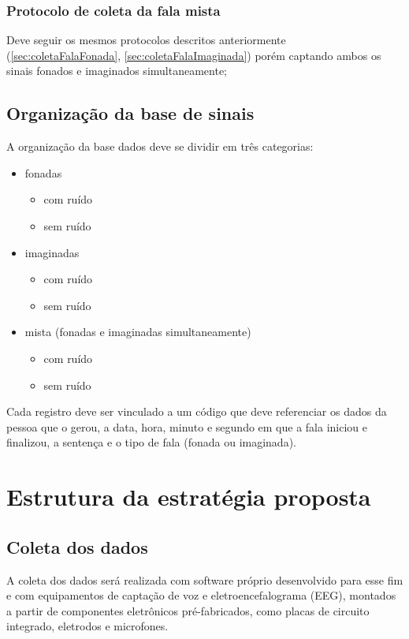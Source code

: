 			\subsubsection{Protocolo de coleta da fala mista}
				\par Deve seguir os mesmos protocolos descritos anteriormente (\autoref{sec:coletaFalaFonada}, \autoref{sec:coletaFalaImaginada}) porém captando ambos os sinais fonados e imaginados simultaneamente;
				

	    \subsection{Organização da base de sinais}
	    	\par A organização da base dados deve se dividir em três categorias:
	    	\begin{itemize}
	    		\item fonadas
	    		\begin{itemize}
	    			\item com ruído
	    			\item sem ruído
	    		\end{itemize}
	    		\item imaginadas
	    		\begin{itemize}
	    			\item com ruído
	    			\item sem ruído
	    		\end{itemize}
	    		\item mista (fonadas e imaginadas simultaneamente)
			    \begin{itemize}
	    			\item com ruído
	    			\item sem ruído
	    		\end{itemize}
	    	\end{itemize}

			\par Cada registro deve ser vinculado a um código que deve referenciar os dados da pessoa que o gerou, a data, hora, minuto e segundo em que a fala iniciou e finalizou, a sentença e o tipo de fala (fonada ou imaginada).

	\section{Estrutura da estratégia proposta}
	
		\subsection{Coleta dos dados}
			\par A coleta dos dados será realizada com software próprio desenvolvido para esse fim e com equipamentos de captação de voz e eletroencefalograma (EEG), montados a partir de componentes eletrônicos pré-fabricados, como placas de circuito integrado, eletrodos e microfones.
	
